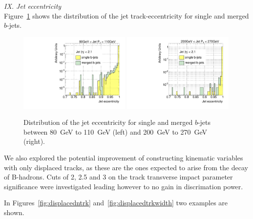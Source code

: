 { \em IX. Jet eccentricity}
\\[3mm]

Figure~\ref{fig:jeteccsinglemerged} shows the distribution of the jet track-eccentricity for single and merged $b$-jets.
\\[3mm]

\begin{figure}[tp]
\centering
\includegraphics[width=0.49\textwidth]{FIGS/VarsSingleMerged/JetEcc080.pdf}
\includegraphics[width=0.49\textwidth]{FIGS/VarsSingleMerged/JetEcc200.pdf}
\caption{Distribution of the jet eccentricity for single and merged $b$-jets between 80~GeV to 110~GeV (left) and 200~GeV to 270~GeV (right).}
\label{fig:jeteccsinglemerged}
\end{figure}


We also explored the potential improvement of constructing kinematic variables with only displaced tracks, as these are the ones expected to arise from the decay of B-hadrons. Cuts of 2, 2.5 and 3 on the track transverse impact parameter significance were investigated leading however to no gain in discrimation power.

 In Figures~\ref{fig:displacedntrk} and~\ref{fig:displacedtrkwidth} two examples are shown.

